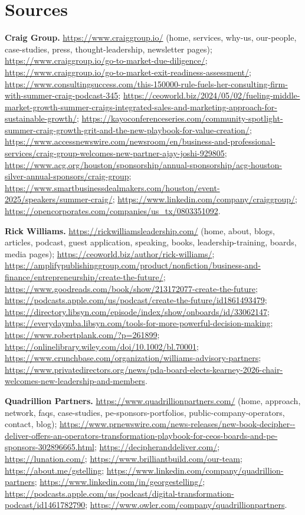 \documentclass[11pt]{article}
\begin{document}
\section*{Sources}
\small
\textbf{Craig Group.}
\url{https://www.craiggroup.io/} (home, services, why-us, our-people, case-studies,
press, thought-leadership, newsletter pages);
\url{https://www.craiggroup.io/go-to-market-due-diligence/};
\url{https://www.craiggroup.io/go-to-market-exit-readiness-assessment/};
\url{https://www.consultingsuccess.com/this-150000-rule-fuels-her-consulting-firm-with-summer-craig-podcast-345};
\url{https://ceoworld.biz/2024/05/02/fueling-middle-market-growth-summer-craigs-integrated-sales-and-marketing-approach-for-sustainable-growth/};
\url{https://kayoconferenceseries.com/community-spotlight-summer-craig-growth-grit-and-the-new-playbook-for-value-creation/};
\url{https://www.accessnewswire.com/newsroom/en/business-and-professional-services/craig-group-welcomes-new-partner-ajay-joshi-929805};
\url{https://www.acg.org/houston/sponsorship/annual-sponsorship/acg-houston-silver-annual-sponsors/craig-group};
\url{https://www.smartbusinessdealmakers.com/houston/event-2025/speakers/summer-craig/};
\url{https://www.linkedin.com/company/craiggroup/};
\url{https://opencorporates.com/companies/us_tx/0803351092}.

\medskip
\textbf{Rick Williams.}
\url{https://rickwilliamsleadership.com/} (home, about, blogs, articles, podcast,
guest application, speaking, books, leadership-training, boards, media pages);
\url{https://ceoworld.biz/author/rick-williams/};
\url{https://amplifypublishinggroup.com/product/nonfiction/business-and-finance/entrepreneurship/create-the-future/};
\url{https://www.goodreads.com/book/show/213172077-create-the-future};
\url{https://podcasts.apple.com/us/podcast/create-the-future/id1861493479};
\url{https://directory.libsyn.com/episode/index/show/onboards/id/33062147};
\url{https://everydaymba.libsyn.com/tools-for-more-powerful-decision-making};
\url{https://www.robertplank.com/?p=261899};
\url{https://onlinelibrary.wiley.com/doi/10.1002/bl.70001};
\url{https://www.crunchbase.com/organization/williams-advisory-partners};
\url{https://www.privatedirectors.org/news/pda-board-elects-kearney-2026-chair-welcomes-new-leadership-and-members}.

\medskip
\textbf{Quadrillion Partners.}
\url{https://www.quadrillionpartners.com/} (home, approach, network, faqs,
case-studies, pe-sponsors-portfolios, public-company-operators, contact, blog);
\url{https://www.prnewswire.com/news-releases/new-book-decipher--deliver-offers-an-operators-transformation-playbook-for-ceos-boards-and-pe-sponsors-302896665.html};
\url{https://decipheranddeliver.com/};
\url{https://lunation.com/};
\url{https://www.brilliantbuild.com/our-team};
\url{https://about.me/gstelling};
\url{https://www.linkedin.com/company/quadrillion-partners};
\url{https://www.linkedin.com/in/georgestelling/};
\url{https://podcasts.apple.com/us/podcast/digital-transformation-podcast/id1461782790};
\url{https://www.owler.com/company/quadrillionpartners}.
\end{document}
